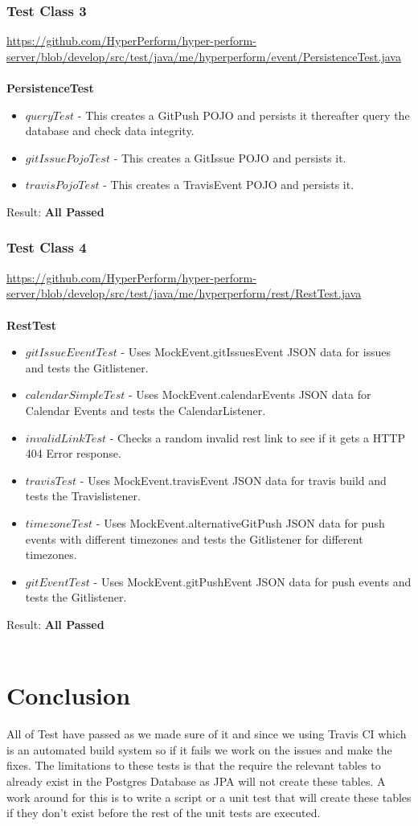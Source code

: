 \documentclass[11pt,a4paper]{article}
\begin{document}
\subsubsection{Test Class 3}
\url{https://github.com/HyperPerform/hyper-perform-server/blob/develop/src/test/java/me/hyperperform/event/PersistenceTest.java}\\\\
\textbf{PersistenceTest}
\begin{itemize}
	\item $queryTest$ - This creates a GitPush POJO and persists it thereafter query the database and check data integrity.
	\item $gitIssuePojoTest$ - This creates a GitIssue POJO and persists it.
	\item $travisPojoTest$ - This creates a TravisEvent POJO and persists it.\\

\end{itemize}
 Result: \textbf{All Passed}


\subsubsection{Test Class 4}
\url{https://github.com/HyperPerform/hyper-perform-server/blob/develop/src/test/java/me/hyperperform/rest/RestTest.java}\\\\
\textbf{RestTest}
\begin{itemize}
	\item $gitIssueEventTest$ - Uses MockEvent.gitIssuesEvent JSON data for issues and tests the Gitlistener.
	\item $calendarSimpleTest$ - Uses MockEvent.calendarEvents JSON data for Calendar Events and tests the CalendarListener.
	\item $invalidLinkTest$ - Checks a random invalid rest link to see if it gets a HTTP 404 Error response.
	\item $travisTest$ - Uses MockEvent.travisEvent JSON data for travis build and tests the Travislistener.
	\item $timezoneTest$ - Uses MockEvent.alternativeGitPush JSON data for push events with different timezones and tests the Gitlistener for different timezones.
	\item $gitEventTest$ - Uses MockEvent.gitPushEvent JSON data for push events and tests the Gitlistener.
\end{itemize}
Result: \textbf{All Passed}\\\\
\section{Conclusion}
All of Test have passed as we made sure of it and since we using Travis CI which is an automated build system so if it fails we work on the issues and make the fixes. The limitations to these tests is that the require the relevant tables to already exist in the Postgres Database as JPA will not create these tables. A work around for this is to write a script or a unit test that will create these tables if they don't exist before the rest of the unit tests are executed.
\end{document}
